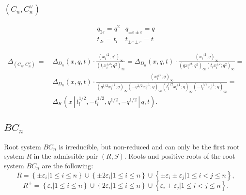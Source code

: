 \documentclass{article}
\def\nn{\nonumber}
\def\nn{\nonumber}
\def\ve{\varepsilon}
\def\ep{\varepsilon}
\begin{document}
\subsubsection*{$(C_n,C_n^{\vee})$}
\begin{equation}
    \begin{array}{ll}
       q_{2\ep} = q^{2}  &  q_{\pm \ep \pm \ep} = q  \\
        t_{2\ep} = t_l &  t_{\pm \ep \pm \ep} =t
    \end{array}
\end{equation}

\begin{align}
    \Delta_{(C_n,C_n^{\vee})}\, = \,& \Delta_{D_n}(x,q,t)\cdot \frac{(x_i^{\pm 2};q^2)_{\infty}}{(t_l x_i^{\pm 2};q^2)_{\infty}} = \Delta_{D_n}(x,q,t)\cdot \frac{(x_i^{\pm 2};q)_{\infty}}{(q x_i^{\pm 2};q^2)_{\infty}(t_l x_i^{\pm 2};q^2)_{\infty}} = \nn \\
    & \Delta_{D_n}(x,q,t)\cdot  \frac{(x_i^{\pm 2};q)_{\infty}}{(q^{1/2} x_i^{\pm 1};q)_{\infty}(-q^{1/2} x_i^{\pm 1};q)_{\infty}(t_l^{1/2} x_i^{\pm 1};q)_{\infty}(-t_l^{1/2} x_i^{\pm 1};q)_{\infty}} = \nn \\
    & \boxed{\Delta_{K} (x \,|\, t_l^{1/2},-t_l^{1/2},q^{1/2},-q^{1/2}\,|\, q,t)}.
\end{align}

\subsection*{$BC_n$}
Root system $BC_n$ is irreducible, but non-reduced and can only be the first root system $R$ in the admissible pair $(R,S)$. Roots and positive roots of the root system $BC_n$ are the following:
\begin{equation}
    R = \left\{\pm \ve_i | 1\leq i\leq n \right\} \cup  \left\{\pm 2 \ve_i | 1\leq i\leq n \right\} \cup\left\{\pm \ve_i\pm \ve_j| 1\leq i < j \leq n\right\},
\end{equation}
\begin{equation}
    R^+ = \left\{ \ve_i | 1\leq i\leq n \right\} \cup  \left\{ 2 \ve_i | 1\leq i\leq n \right\} \cup\left\{ \ve_i\pm \ve_j| 1\leq i < j \leq n\right\}.
\end{equation}
\end{document}
